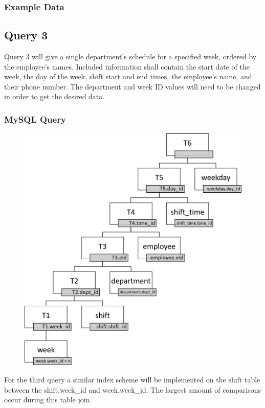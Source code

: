 \documentclass[letter,12pt]{texMemo}
\begin{document}
\subsubsection*{Example Data}
\begin{changemargin}{-1.25cm}{-1.25cm}
	\begin{center}
		
	\end{center}
\end{changemargin}

\subsection*{Query 3}
Query 3 will give a single department's schedule for a specified week, ordered by the employee's names. Included information shall contain the start date of the week, the day of the week, shift start and end times, the employee's name, and their phone number. The department and week ID values will need to be changed in order to get the desired data.\subsubsection*{MySQL Query}
	
\begin{figure}[H]
	\centering
	\includegraphics[width=.6\textwidth]{query3.png}
\end{figure}
For the third query a similar index scheme will be implemented on the shift table between the shift.week\_id and week.week\_id. The largest amount of comparisons occur during this table join. 
\end{document}
